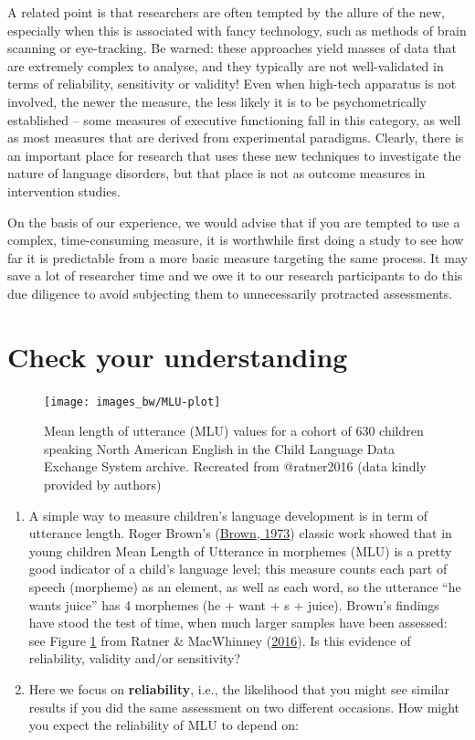 \documentclass{krantz}
\begin{document}
A related point is that researchers are often tempted by the allure of the new, especially when this is associated with fancy technology, such as methods of brain scanning or eye-tracking. Be warned: these approaches yield masses of data that are extremely complex to analyse, and they typically are not well-validated in terms of reliability, sensitivity or validity! Even when high-tech apparatus is not involved, the newer the measure, the less likely it is to be psychometrically established -- some measures of executive functioning fall in this category, as well as most measures that are derived from experimental paradigms. Clearly, there is an important place for research that uses these new techniques to investigate the nature of language disorders, but that place is not as outcome measures in intervention studies.

On the basis of our experience, we would advise that if you are tempted to use a complex, time-consuming measure, it is worthwhile first doing a study to see how far it is predictable from a more basic measure targeting the same process. It may save a lot of researcher time and we owe it to our research participants to do this due diligence to avoid subjecting them to unnecessarily protracted assessments.

\hypertarget{check-your-understanding-2}{%
\section{Check your understanding}\label{check-your-understanding-2}}

\begin{figure}
\texttt{[image: images\_bw/MLU-plot]} \caption{Mean length of utterance (MLU) values for a cohort of 630 children speaking North American English in the Child Language Data Exchange System archive. Recreated from @ratner2016 (data kindly provided by authors)}\label{fig:MLU-plot}
\end{figure}

\begin{enumerate}
\def\labelenumi{\arabic{enumi}.}
\item
  A simple way to measure children's language development is in term of utterance length. Roger Brown's (\protect\hyperlink{ref-brown1973}{Brown, 1973}) classic work showed that in young children Mean Length of Utterance in morphemes (MLU) is a pretty good indicator of a child's language level; this measure counts each part of speech (morpheme) as an element, as well as each word, so the utterance ``he wants juice'' has 4 morphemes (he + want + s + juice). Brown's findings have stood the test of time, when much larger samples have been assessed: see Figure \ref{fig:MLU-plot} from Ratner \& MacWhinney (\protect\hyperlink{ref-ratner2016}{2016}). Is this evidence of reliability, validity and/or sensitivity?
\item
  Here we focus on \textbf{reliability}, i.e., the likelihood that you might see similar results if you did the same assessment on two different occasions. How might you expect the reliability of MLU to depend on:
\end{enumerate}
\end{document}
